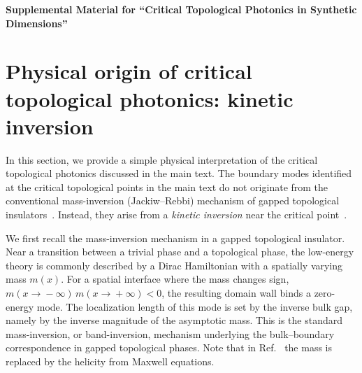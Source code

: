 \documentclass[aps,prl,twocolumn,preprintnumbers,amsmath,amssymb,superscriptaddress,10pt]{revtex4-2}
\begin{document}
\let\addcontentsline\oldaddcontentsline%
\onecolumngrid

\clearpage
\newpage

\widetext

\begin{center}
\textbf{\large Supplemental Material for ``Critical Topological Photonics in Synthetic Dimensions''}
\end{center}

\maketitle

\renewcommand{\thefigure}{S\arabic{figure}}
\setcounter{figure}{0}
\renewcommand{\theequation}{S\arabic{equation}}
\setcounter{equation}{0}
\renewcommand{\thesection}{\Roman{section}}
\renewcommand{\thesubsection}{\Alph{subsection}}
\setcounter{section}{0}
\setcounter{secnumdepth}{4}

\makeatletter
{}
\makeatother

{
\tableofcontents
}


\section{Physical origin of critical topological photonics: kinetic inversion}
\label{sec:SM_kinetic_inversion}
In this section, we provide a simple physical interpretation of the 
critical topological photonics discussed in the main text.  The boundary modes identified at the critical topological points in the
main text do not originate from the conventional mass-inversion (Jackiw--Rebbi) mechanism of gapped topological
insulators~\cite{PhysRevD.13.3398}. Instead, they arise from a \emph{kinetic inversion} near the critical
point~\cite{verresen2020}. 

We first recall the mass-inversion mechanism in a gapped topological insulator. Near a transition between a trivial phase and a topological phase, the low-energy theory is commonly described by a Dirac Hamiltonian with a spatially varying mass $m(x)$. For a spatial interface where the mass changes sign, $m(x\!\to\!-\infty)\,m(x\!\to\!+\infty)<0$, the resulting domain wall binds a zero-energy mode. The localization length of this mode is set by the inverse bulk gap, namely by the inverse magnitude of the asymptotic mass. This is the standard mass-inversion, or band-inversion, mechanism underlying the bulk--boundary correspondence in gapped topological phases.
Note that in Ref.~\cite{bliokh2019topological} the mass is replaced by the helicity from Maxwell equations.
\end{document}
